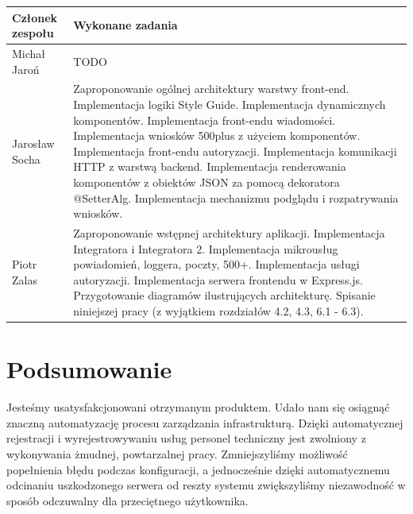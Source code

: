 \documentclass[licencjacka]{pracamgr}
\begin{document}
\begin{tabularx}{\linewidth}{|l|X|} \hline
	\textbf{Członek zespołu} & \textbf{Wykonane zadania} \\
	\hline
	Michał Jaroń & TODO\\
	\hline
	Jarosław Socha & Zaproponowanie ogólnej architektury warstwy front-end. \newline
		Implementacja logiki Style Guide. \newline
		Implementacja dynamicznych komponentów. \newline
		Implementacja front-endu wiadomości. \newline
		Implementacja wniosków 500plus z użyciem komponentów. \newline
		Implementacja front-endu autoryzacji. \newline
		Implementacja komunikacji HTTP z warstwą backend. \newline
		Implementacja renderowania komponentów z obiektów JSON za pomocą dekoratora @SetterAlg. \newline
		Implementacja mechanizmu podglądu i rozpatrywania wniosków.
	\\
	\hline 
	Piotr Zalas & Zaproponowanie wstępnej architektury aplikacji.\newline
	  Implementacja Integratora i Integratora 2.\newline
	  Implementacja mikrousług powiadomień, loggera, poczty, 500+.\newline
	  Implementacja usługi autoryzacji.\newline
	  Implementacja serwera frontendu w Express.js.\newline
	  Przygotowanie diagramów ilustrujących architekturę.\newline
	  Spisanie niniejszej pracy (z wyjątkiem rozdziałów 4.2, 4.3, 6.1 - 6.3).\\
	\hline
\end{tabularx}

\chapter{Podsumowanie}

Jesteśmy usatysfakcjonowani otrzymanym produktem. Udało nam się osiągnąć znaczną
automatyzację procesu zarządzania infrastrukturą. Dzięki automatycznej rejestracji i
wyrejestrowywaniu usług personel techniczny jest zwolniony z wykonywania żmudnej,
powtarzalnej pracy. Zmniejszyliśmy możliwość popełnienia błędu podczas konfiguracji,
a jednocześnie dzięki automatycznemu odcinaniu uszkodzonego serwera od reszty systemu
zwiększyliśmy niezawodność w sposób odczuwalny dla przeciętnego użytkownika.
\end{document}
